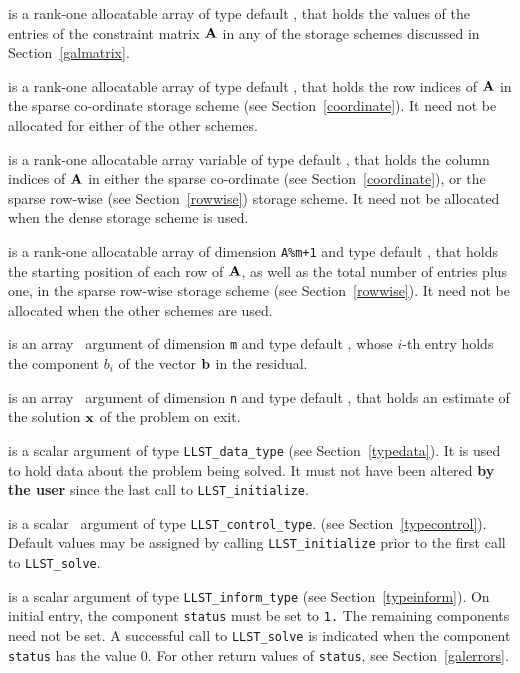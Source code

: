 \documentclass{galahad}
\newcommand{\packagename}{LLST}
\begin{document}
\begin{description}
\begin{description}
 is a rank-one allocatable array of type default \realdp, that holds
the values of the entries of the constraint matrix ${\mathbf{A}}$ in any of the 
storage schemes discussed in Section~\ref{galmatrix}.

 is a rank-one allocatable array of type default \integer,
that holds the row indices of ${\mathbf{A}}$ in the sparse co-ordinate storage
scheme (see Section~\ref{coordinate}). 
It need not be allocated for either of the other schemes.

 is a rank-one allocatable array variable of type default \integer,
that holds the column indices of ${\mathbf{A}}$ in either the sparse co-ordinate 
(see Section~\ref{coordinate}), or the sparse row-wise 
(see Section~\ref{rowwise}) storage scheme.
It need not be allocated when the dense storage scheme is used.

 is a rank-one allocatable array of dimension {\tt A\%m+1} and type 
default \integer, that holds the starting position of 
each row of ${\mathbf{A}}$, as well
as the total number of entries plus one, in the sparse row-wise storage
scheme (see Section~\ref{rowwise}). It need not be allocated when the
other schemes are used.
\end{description}

 is an array \intentin\ argument of dimension {\tt m} and  
type default \realdp,  whose $i$-th entry holds the component $b_i$ of 
the vector ${\mathbf{b}}$ in the residual.

 is an array \intentout\ argument of dimension {\tt n} and  
type default \realdp, that holds an estimate of the solution ${\mathbf{x}}$ 
of the problem on exit.
 
 is a scalar \intentinout argument of type 
{\tt \packagename\_data\_type}
(see Section~\ref{typedata}). It is used to hold data about the problem being 
solved. It must not have been altered {\bf by the user} since the last call to 
{\tt \packagename\_initialize}.

 is a scalar \intentin\ argument of type 
{\tt \packagename\_control\_type}. 
(see Section~\ref{typecontrol}). 
Default values may be assigned by calling {\tt \packagename\_initialize} 
prior to the first call to {\tt \packagename\_solve}.  
 
 is a scalar \intentinout argument of type 
{\tt \packagename\_inform\_type}
(see Section~\ref{typeinform}). 
On initial entry, the component {\tt status} must be set to {\tt 1.} 
The remaining components need not be set. 
A successful call to
{\tt \packagename\_solve}
is indicated when the  component {\tt status} has the value 0. 
For other return values of {\tt status}, see Section~\ref{galerrors}.


\end{description}
\end{document}
